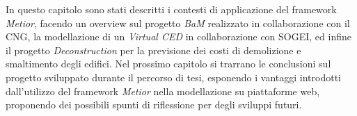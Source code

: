 In questo capitolo sono stati descritti i contesti di applicazione del framework
\emph{Metior}, facendo un overview sul progetto \emph{BaM} realizzato in collaborazione con il CNG,
la modellazione di un \emph{Virtual CED} in collaborazione con
SOGEI, ed infine il progetto \emph{Deconstruction} per la previsione dei costi di demolizione e smaltimento degli edifici.
Nel prossimo capitolo si trarrano le conclusioni sul progetto sviluppato durante il
percorso di tesi, esponendo i vantaggi introdotti dall’utilizzo del framework
\emph{Metior} nella modellazione su piattaforme web, proponendo dei possibili
spunti di riflessione per degli sviluppi futuri.
